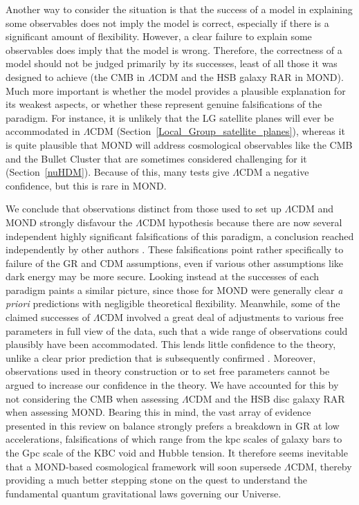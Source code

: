 \documentclass[fleqn,usenatbib,useAMS,onecolumn]{mnras} %
\begin{document}
Another way to consider the situation is that the success of a model in explaining some observables does not imply the model is correct, especially if there is a significant amount of flexibility. However, a clear failure to explain some observables does imply that the model is wrong. Therefore, the correctness of a model should not be judged primarily by its successes, least of all those it was designed to achieve (the CMB in $\Lambda$CDM and the HSB galaxy RAR in MOND). Much more important is whether the model provides a plausible explanation for its weakest aspects, or whether these represent genuine falsifications of the paradigm. For instance, it is unlikely that the LG satellite planes will ever be accommodated in $\Lambda$CDM (Section~\ref{Local_Group_satellite_planes}), whereas it is quite plausible that MOND will address cosmological observables like the CMB and the Bullet Cluster that are sometimes considered challenging for it (Section~\ref{nuHDM}). Because of this, many tests give $\Lambda$CDM a negative confidence, but this is rare in MOND.

We conclude that observations distinct from those used to set up $\Lambda$CDM and MOND strongly disfavour the $\Lambda$CDM hypothesis because there are now several independent highly significant falsifications of this paradigm, a conclusion reached independently by other authors \citep[e.g.][]{Kroupa_2010, Kroupa_2012, Kroupa_2015, Valentino_2021}. These falsifications point rather specifically to failure of the GR and CDM assumptions, even if various other assumptions like dark energy may be more secure. Looking instead at the successes of each paradigm paints a similar picture, since those for MOND were generally clear \emph{a priori} predictions with negligible theoretical flexibility. Meanwhile, some of the claimed successes of $\Lambda$CDM involved a great deal of adjustments to various free parameters in full view of the data, such that a wide range of observations could plausibly have been accommodated. This lends little confidence to the theory, unlike a clear prior prediction that is subsequently confirmed \citep{Merritt_2020}. Moreover, observations used in theory construction or to set free parameters cannot be argued to increase our confidence in the theory. We have accounted for this by not considering the CMB when assessing $\Lambda$CDM and the HSB disc galaxy RAR when assessing MOND. Bearing this in mind, the vast array of evidence presented in this review on balance strongly prefers a breakdown in GR at low accelerations, falsifications of which range from the kpc scales of galaxy bars to the Gpc scale of the KBC void and Hubble tension. It therefore seems inevitable that a MOND-based cosmological framework will soon supersede $\Lambda$CDM, thereby providing a much better stepping stone on the quest to understand the fundamental quantum gravitational laws governing our Universe.
\end{document}

